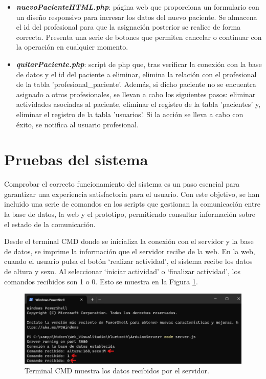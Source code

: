 \begin{itemize}
\begin{itemize}
\begin{itemize}
            \item \textbf{\textit{nuevoPacienteHTML.php}}: página web que proporciona un formulario con un diseño responsivo para incresar los datos del nuevo paciente. Se almacena el id del profesional para que la asignación posterior se realice de forma correcta. Presenta una serie de botones que permiten cancelar o continuar con la operación en cualquier momento.
            \item \textbf{\textit{quitarPaciente.php}}: script de php que, tras verificar la conexión con la base de datos y el id del paciente a eliminar, elimina la relación con el profesional de la tabla 'profesional\_paciente'. Además, si dicho paciente no se encuentra asignado a otros profesionales, se llevan a cabo los siguientes pasos: eliminar actividades asociadas al paciente, eliminar el registro de la tabla 'pacientes' y, eliminar el registro de la tabla 'usuarios'. Si la acción se lleva a cabo con éxito, se notifica al usuario profesional.
        \end{itemize}
    \end{itemize}
\end{itemize}

\section{Pruebas del sistema}

Comprobar el correcto funcionamiento del sistema es un paso esencial para garantizar una experiencia satisfactoria para el usuario. Con este objetivo, se han incluido una serie de comandos en los scripts que gestionan la comunicación entre la base de datos, la web y el prototipo, permitiendo consultar información sobre el estado de la comunicación.

Desde el terminal CMD donde se inicializa la conexión con el servidor y la base de datos, se imprime la información que el servidor recibe de la web. En la web, cuando el usuario pulsa el botón `realizar actividad', el sistema recibe los datos de altura y sexo. Al seleccionar `iniciar actividad' o `finalizar actividad', los comandos recibidos son 1 o 0. Esto se muestra en la Figura \ref{fig:cmd}.

\begin{figure}[h]
    \centering
    \includegraphics[width=1\textwidth]{img/C2_PruebasSistema/cmd.png}
    \caption{Terminal CMD muestra los datos recibidos por el servidor.}
    \label{fig:cmd}
\end{figure}

